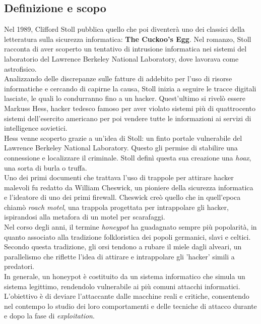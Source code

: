 \documentclass[12pt,a4paper,oneside,onecolumn,openright]{book}
\begin{document}
\subsection{Definizione e scopo}
Nel 1989, Clifford Stoll pubblica quello che poi diventerà uno dei classici della 
letteratura sulla sicurezza informatica: \textbf{The Cuckoo's Egg}. 
Nel romanzo, Stoll racconta di aver scoperto un tentativo di intrusione informatica 
nei sistemi del laboratorio del Lawrence Berkeley National Laboratory, 
dove lavorava come astrofisico.\\
Analizzando delle discrepanze sulle fatture di addebito per l'uso di risorse informatiche 
e cercando di capirne la causa, Stoll inizia a seguire le tracce digitali lasciate, 
le quali lo condurranno fino a un hacker. Quest'ultimo si rivelò essere Markuss Hess, 
hacker tedesco famoso per aver violato sistemi più di quattrocento sistemi dell'esercito 
americano per poi vendere tutte le informazioni ai servizi di intelligence sovietici.\\
Hess venne scoperto grazie a un'idea di Stoll: un finto portale vulnerabile del 
Lawrence Berkeley National Laboratory. Questo gli permise di stabilire una connessione 
e localizzare il criminale. Stoll definì questa sua creazione una \textit{hoax}, 
una sorta di burla o truffa.\\
Uno dei primi documenti che trattava l'uso di trappole per attirare hacker malevoli 
fu redatto da William Cheswick, un pioniere della sicurezza informatica e l'ideatore di 
uno dei primi firewall. Cheswick creò quello che in quell'epoca chiamò \textit{roach motel}, 
una trappola progettata per intrappolare gli hacker, ispirandosi alla metafora di un 
motel per scarafaggi.\\
Nel corso degli anni, il termine \textit{honeypot} ha guadagnato sempre più popolarità, 
in quanto associato alla tradizione folkloristica dei popoli germanici, 
slavi e celtici. Secondo questa tradizione, gli orsi tendono a rubare il miele dagli 
alveari, un parallelismo che riflette l'idea di attirare e intrappolare gli 'hacker' 
simili a predatori.\\
In generale, un honeypot è costituito da un sistema informatico che simula un 
sistema legittimo, rendendolo vulnerabile ai più comuni attacchi informatici. 
L'obiettivo è di deviare l'attaccante dalle macchine reali e critiche, consentendo 
nel contempo lo studio dei loro comportamenti e delle tecniche di attacco durante e 
dopo la fase di \textit{exploitation}.\\
\end{document}

